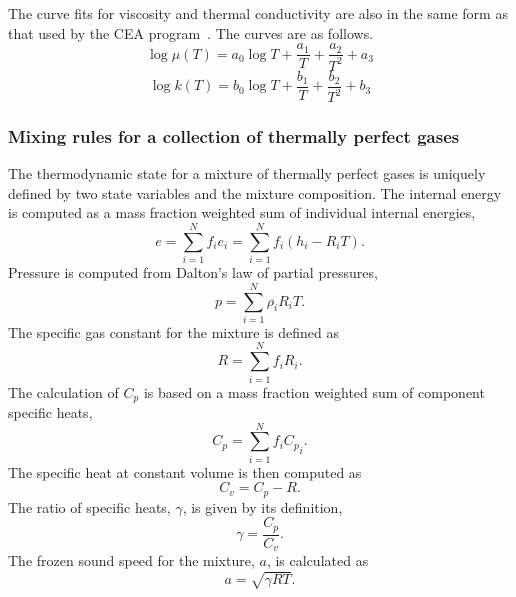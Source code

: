 \medskip
The curve fits for viscosity and thermal conductivity are also in the same form as
that used by the CEA program~\cite{mcbride_gordon_96}.
The curves are as follows.
\begin{equation*}
\log{\mu(T)}  =  a_0 \log{T} + \frac{a_1}{T} + \frac{a_2}{T^2} + a_3
\end{equation*}
\begin{equation*}
\log{k(T)} = b_0 \log{T} + \frac{b_1}{T} + \frac{b_2}{T^2} + b_3
\end{equation*}

\subsubsection{Mixing rules for a collection of thermally perfect gases}
%
The thermodynamic state for a mixture of thermally perfect gases is uniquely
defined by two state variables and the mixture composition.
The internal energy is computed as a mass fraction weighted sum of
individual internal energies,
\begin{equation}
e = \sum_{i=1}^{N} f_i e_i = \sum_{i=1}^{N} f_i \left( h_i - R_i T \right).
\end{equation}
Pressure is computed from Dalton's law of partial pressures,
\begin{equation}
p = \sum_{i=1}^{N} \rho_i R_i T.
\end{equation}
The specific gas constant for the mixture is defined as
\begin{equation}
R = \sum_{i=1}^{N} f_i R_i.
\end{equation}
The calculation of $C_p$ is based on a mass fraction weighted sum of component
specific heats,
\begin{equation}
C_p = \sum_{i=1}^{N} f_i {C_p}_i.
\end{equation}
The specific heat at constant volume is then computed as
\begin{equation}
C_v = C_p - R.
\end{equation}
The ratio of specific heats, $\gamma$, is given by its definition,
\begin{equation}
\gamma = \frac{C_p}{C_v}.
\end{equation}
The frozen sound speed for the mixture, $a$, is calculated as
\begin{equation}
a = \sqrt{\gamma R T}.
\end{equation}

